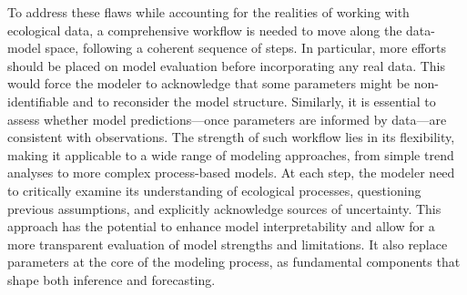 \documentclass[11pt]{article}
\begin{document}
To address these flaws while accounting for the realities of working with ecological data, a comprehensive workflow is needed to move along the data-model space, following a coherent sequence of steps. In particular, more efforts should be placed on model evaluation before incorporating any real data. This would force the modeler to acknowledge that some parameters might be non-identifiable and to reconsider the model structure. Similarly, it is essential to assess whether model predictions---once parameters are informed by data---are consistent with observations. The strength of such workflow lies in its flexibility, making it applicable to a wide range of modeling approaches, from simple trend analyses to more complex process-based models. At each step, the modeler need to critically examine its understanding of ecological processes, questioning previous assumptions, and explicitly acknowledge sources of uncertainty. This approach has the potential to enhance model interpretability and allow for a more transparent evaluation of model strengths and limitations. It also replace parameters at the core of the modeling process, as fundamental components that shape both inference and forecasting.
\end{document}

